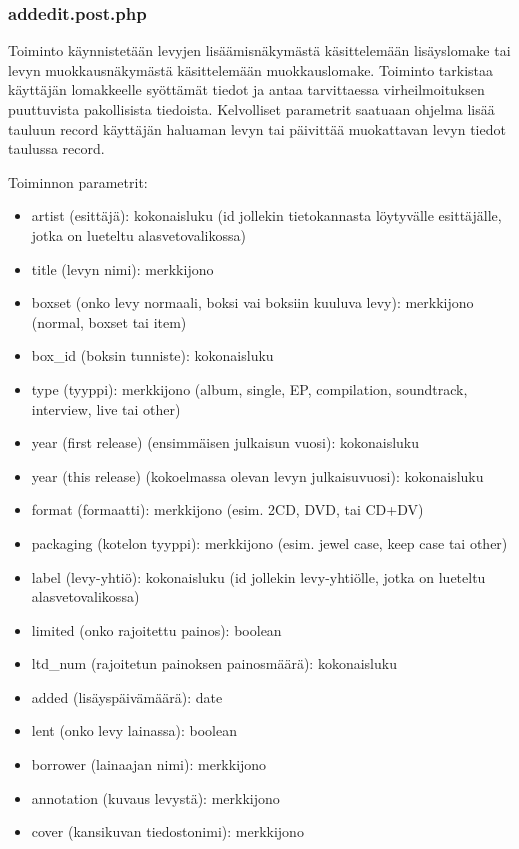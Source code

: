 \documentclass[a4paper,12pt]{report}
\begin{document}
\subsubsection{addedit.post.php}

Toiminto käynnistetään levyjen lisäämisnäkymästä käsittelemään lisäyslomake
tai levyn muokkausnäkymästä käsittelemään muokkauslomake.  Toiminto
tarkistaa käyttäjän lomakkeelle syöttämät tiedot ja antaa tarvittaessa
virheilmoituksen puuttuvista pakollisista tiedoista.  Kelvolliset parametrit
saatuaan ohjelma lisää tauluun record käyttäjän haluaman levyn tai päivittää
muokattavan levyn tiedot taulussa record.

Toiminnon parametrit:
\begin{itemize}
  \item artist (esittäjä): kokonaisluku (id jollekin tietokannasta
    löytyvälle esittäjälle, jotka on lueteltu alasvetovalikossa)
  \item title (levyn nimi): merkkijono
  \item boxset (onko levy normaali, boksi vai boksiin kuuluva levy):
    merkkijono (normal, boxset tai item)
  \item box\_id (boksin tunniste): kokonaisluku
  \item type (tyyppi): merkkijono (album, single, EP, compilation,
    soundtrack, interview, live tai other)
  \item year (first release) (ensimmäisen julkaisun vuosi): kokonaisluku
  \item year (this release) (kokoelmassa olevan levyn julkaisuvuosi):
    kokonaisluku
  \item format (formaatti): merkkijono (esim. 2CD, DVD, tai CD+DV)
  \item packaging (kotelon tyyppi): merkkijono (esim. jewel case, keep
    case tai other)
  \item label (levy-yhtiö): kokonaisluku (id jollekin levy-yhtiölle, jotka
    on lueteltu alasvetovalikossa)
  \item limited (onko rajoitettu painos): boolean
  \item ltd\_num (rajoitetun painoksen painosmäärä): kokonaisluku
  \item added (lisäyspäivämäärä): date
  \item lent (onko levy lainassa): boolean
  \item borrower (lainaajan nimi): merkkijono
  \item annotation (kuvaus levystä): merkkijono
  \item cover (kansikuvan tiedostonimi): merkkijono
\end{itemize}
\end{document}
